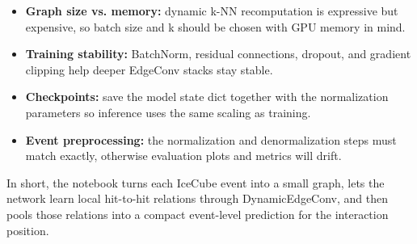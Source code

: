 \documentclass[11pt,a4paper]{article}
\begin{document}
\begin{itemize}
    \item \textbf{Graph size vs. memory:} dynamic k-NN recomputation is expressive but expensive, so batch size and k should be chosen with GPU memory in mind.
    \item \textbf{Training stability:} BatchNorm, residual connections, dropout, and gradient clipping help deeper EdgeConv stacks stay stable.
    \item \textbf{Checkpoints:} save the model state dict together with the normalization parameters so inference uses the same scaling as training.
    \item \textbf{Event preprocessing:} the normalization and denormalization steps must match exactly, otherwise evaluation plots and metrics will drift.
\end{itemize}

In short, the notebook turns each IceCube event into a small graph, lets the network learn local hit-to-hit relations through DynamicEdgeConv, and then pools those relations into a compact event-level prediction for the interaction position.
\end{document}
